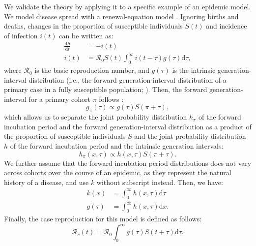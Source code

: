 \documentclass[12pt]{article}
\begin{document}
We validate the theory by applying it to a specific example of an epidemic model. 
We model disease spread with a renewal-equation model \citep{heesterbeek1996concept, diekmann2000mathematical, roberts2004modelling, aldis2005integral, roberts2007model, champredon2018equivalence}.
Ignoring births and deaths, changes in the proportion of susceptible individuals $S(t)$ and incidence of infection $i(t)$ can be written as:
\begin{equation}
\begin{aligned}
\frac{\mathrm{d}S}{\mathrm{d}t} &= - i(t)\\
i(t) &= \mathcal R_0 S(t) \int_0^\infty i(t-\tau) g(\tau) \mathrm{d}\tau,
\end{aligned}
\label{eq:renewal}
\end{equation}
where $\mathcal R_0$ is the basic reproduction number, and $g(\tau)$ is the intrinsic generation-interval distribution (i.e., the forward generation-interval distribution of a primary case in a fully susceptible population; \cite{champredon2015intrinsic}).
Then, the forward generation-interval for a primary cohort $\pi$ follows \citep{champredon2015intrinsic}:
\begin{equation}
g_\pi (\tau) \propto g(\tau) S(\pi + \tau),
\end{equation}
which allows us to separate the joint probability distribution $h_\pi$ of the forward incubation period and the forward generation-interval distribution as a product of the proportion of susceptible individuals $S$ and the joint probability distribution $h$ of the forward incubation period and the intrinsic generation intervals:
\begin{equation}
h_\pi (x, \tau) \propto h(x, \tau) S(\pi + \tau).
\end{equation}
We further assume that the forward incubation period distributions does not vary across cohorts over the course of an epidemic, as they represent the natural history of a disease, and use $k$ without subscript instead. 
Then, we have:
\begin{equation}
\begin{aligned}
k(x) &= \int_0^\infty h(x, \tau) \mathrm{d}\tau\\
g(\tau) &= \int_0^\infty h(x, \tau) \mathrm{d}x.
\end{aligned}
\end{equation}
Finally, the case reproduction for this model is defined as follows:
\begin{equation}
\mathcal R_c(t) = \mathcal R_0 \int_0^\infty g(\tau) S(t+\tau) \mathrm{d} \tau.
\end{equation}
\end{document}
